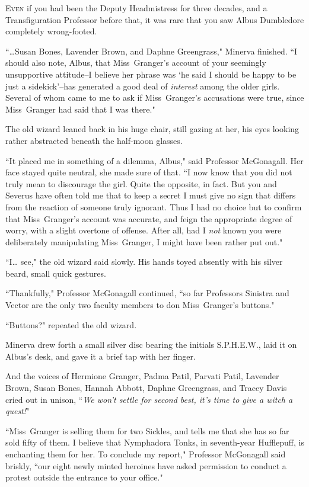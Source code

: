 
\lettrine{E}{ven} if you had been the Deputy Headmistress for three decades, and a Transfiguration Professor before that, it was rare that you saw Albus Dumbledore completely wrong-footed.

``{\ldots}Susan Bones, Lavender Brown, and Daphne Greengrass," Minerva finished. ``I should also note, Albus, that Miss~Granger's account of your seemingly unsupportive attitude\---I believe her phrase was `he said I should be happy to be just a sidekick'\---has generated a good deal of \emph{interest} among the older girls. Several of whom came to me to ask if Miss~Granger's accusations were true, since Miss~Granger had said that I was there."

The old wizard leaned back in his huge chair, still gazing at her, his eyes looking rather abstracted beneath the half-moon glasses.

``It placed me in something of a dilemma, Albus," said Professor McGonagall. Her face stayed quite neutral, she made sure of that. ``I now know that you did not truly mean to discourage the girl. Quite the opposite, in fact. But you and Severus have often told me that to keep a secret I must give no sign that differs from the reaction of someone truly ignorant. Thus I had no choice but to confirm that Miss~Granger's account was accurate, and feign the appropriate degree of worry, with a slight overtone of offense. After all, had I \emph{not} known you were deliberately manipulating Miss~Granger, I might have been rather put out."

``I{\ldots} see," the old wizard said slowly. His hands toyed absently with his silver beard, small quick gestures.

``Thankfully," Professor McGonagall continued, ``so far Professors Sinistra and Vector are the only two faculty members to don Miss~Granger's buttons."

``Buttons?" repeated the old wizard.

Minerva drew forth a small silver disc bearing the initials S.P.H.E.W., laid it on Albus's desk, and gave it a brief tap with her finger.

And the voices of Hermione Granger, Padma Patil, Parvati Patil, Lavender Brown, Susan Bones, Hannah Abbott, Daphne Greengrass, and Tracey Davis cried out in unison, ``\emph{We won't settle for second best, it's time to give a witch a quest!}"

``Miss~Granger is selling them for two Sickles, and tells me that she has so far sold fifty of them. I believe that Nymphadora Tonks, in seventh-year Hufflepuff, is enchanting them for her. To conclude my report," Professor McGonagall said briskly, ``our eight newly minted heroines have asked permission to conduct a protest outside the entrance to your office."

